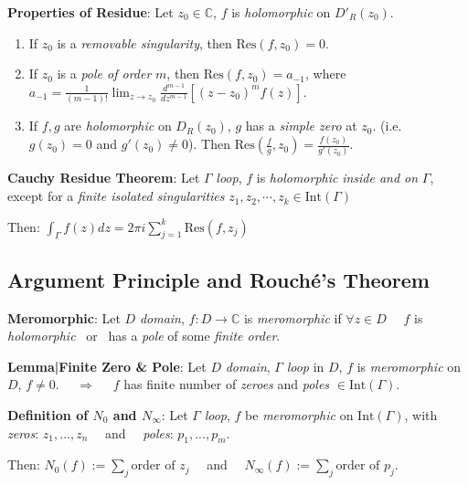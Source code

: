 \documentclass[9pt]{article}
\begin{document}
\textbf{Properties of Residue}: Let $z_0\in\mathbb{C}$, $f$ is \textit{holomorphic} on $D'_{R}(z_0)$.

\begin{enumerate}[itemsep=-2pt, topsep=-2pt]
    \item If $z_0$ is a \textit{removable singularity}, then $\text{Res}(f,z_0)=0$.
    \item If $z_0$ is a \textit{pole of order} $m$, then $\text{Res}(f,z_0)=a_{-1}$, where $a_{-1}=\frac{1}{(m-1)!}\lim_{z\to z_0}\frac{d^{m-1}}{dz^{m-1}}\left[(z-z_0)^mf(z)\right]$.
    \item If $f,g$ are \textit{holomorphic} on $D_{R}(z_0)$, $g$ has a \textit{simple zero} at $z_0$. {\scriptsize (i.e. $g(z_0)=0$ and $g'(z_0)\ne 0$)}. Then $\text{Res}\left(\frac{f}{g},z_0\right)=\frac{f(z_0)}{g'(z_0)}$.
\end{enumerate}

\newpage

\textbf{Cauchy Residue Theorem}: Let $\Gamma$ \textit{loop}, $f$ is \textit{holomorphic} \textit{inside and on} $\Gamma$, except for a \textit{finite isolated singularities} $z_1,z_2,\cdots,z_k\in\text{Int}(\Gamma)$

\quad Then: $\int_{\Gamma}f(z)dz=2\pi i\sum^k_{j=1}\text{Res}(f,z_j)$ 


\subsection{Argument Principle and Rouché's Theorem} %

\textbf{Meromorphic}: Let $D$ \textit{domain}, $f:D\to\mathbb{C}$ is \textit{meromorphic} if $\forall z\in D$ \ \ $f$ is \textit{holomorphic} \ or \ has a \textit{pole} of some \textit{finite order}.

\quad \textbf{Lemma|Finite Zero \& Pole}: {\small Let $D$ \textit{domain}, $\Gamma$ \textit{loop} in $D$, $f$ is \textit{meromorphic} on $D$, $f\ne0$. \ \ $\Rightarrow$ \ \ $f$ has finite number of \textit{zeroes} and \textit{poles} $\in\text{Int}(\Gamma)$.}

\textbf{Definition of $N_0$ and $N_\infty$}: Let $\Gamma$ \textit{loop}, $f$ be \textit{meromorphic} on $\text{Int}(\Gamma)$, with \quad \textit{zeros}: $z_1,...,z_n$ \ \ and \ \ \textit{poles}: $p_1,...,p_m$.

\quad Then: $N_0(f):=\sum_j\text{order of }z_j$ \ \ and \ \ $N_\infty(f):=\sum_j\text{order of }p_j$.
\end{document}
